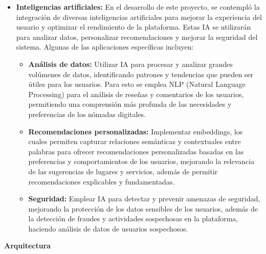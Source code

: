 \begin{itemize}
    \item \textbf{Inteligencias artificiales:} En el desarrollo de este proyecto, se contempló la integración de diversas inteligencias artificiales para mejorar la experiencia del usuario y optimizar el rendimiento de la plataforma. Estas IA se utilizarán para analizar datos, personalizar recomendaciones y mejorar la seguridad del sistema. Algunas de las aplicaciones específicas incluyen:
        \begin{itemize}
            \item \textbf{Análisis de datos: } Utilizar IA para procesar y analizar grandes volúmenes de datos, identificando patrones y tendencias que pueden ser útiles para los usuarios. Para esto se emplea NLP (Natural Language Processing) para el análisis de reseñas y comentarios de los usuarios, permitiendo una comprensión más profunda de las necesidades y preferencias de los nómadas digitales.
            \item \textbf{Recomendaciones personalizadas: } Implementar embeddings, los cuales permiten capturar relaciones semánticas y contextuales entre palabras para ofrecer recomendaciones personalizadas basadas en las preferencias y comportamientos de los usuarios, mejorando la relevancia de las sugerencias de lugares y servicios, además de permitir recomendaciones explicables y fundamentadas.
            \item \textbf{Seguridad: } Emplear IA para detectar y prevenir amenazas de seguridad, mejorando la protección de los datos sensibles de los usuarios, además de la detección de fraudes y actividades sospechosas en la plataforma, haciendo análisis de datos de usuarios sospechosos.
        \end{itemize}
\end{itemize}
\vspace{5mm}
\textbf{Arquitectura} 


